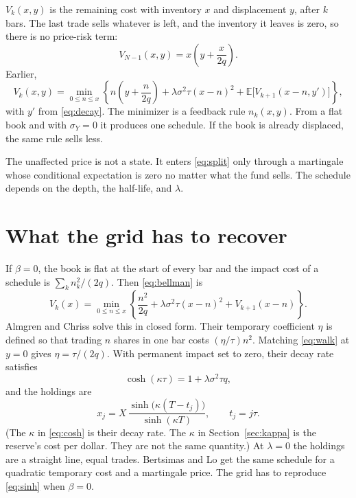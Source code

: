\documentclass[11pt]{article}
\begin{document}
\(V_k(x,y)\) is the remaining cost with inventory \(x\) and displacement \(y\), after \(k\) bars. The last trade sells whatever is left, and the inventory it leaves is zero, so there is no price-risk term:
\begin{equation}
\label{eq:terminal}
V_{N-1}(x,y) = x\left(y + \frac{x}{2q}\right).
\end{equation}
Earlier,
\begin{equation}
\label{eq:bellman}
V_k(x,y)
  = \min_{0\leq n\leq x}
    \left\{
      n\left(y+\frac{n}{2q}\right)
      + \lambda\sigma^{2}\tau(x-n)^{2}
      + \mathbb{E}\bigl[V_{k+1}(x-n, y')\bigr]
    \right\},
\end{equation}
with \(y'\) from \eqref{eq:decay}. The minimizer is a feedback rule \(n_k(x,y)\). From a flat book and with \(\sigma_Y = 0\) it produces one schedule. If the book is already displaced, the same rule sells less.

The unaffected price is not a state. It enters \eqref{eq:split} only through a martingale whose conditional expectation is zero no matter what the fund sells. The schedule depends on the depth, the half-life, and \(\lambda\).

\section{What the grid has to recover}
\label{sec:limits}

If \(\beta = 0\), the book is flat at the start of every bar and the impact cost of a schedule is \(\sum_k n_k^{2}/(2q)\). Then \eqref{eq:bellman} is
\begin{equation}
\label{eq:ac-bellman}
V_k(x)
  = \min_{0\leq n\leq x}
    \left\{
      \frac{n^{2}}{2q} + \lambda\sigma^{2}\tau(x-n)^{2} + V_{k+1}(x-n)
    \right\}.
\end{equation}
Almgren and Chriss solve this in closed form. Their temporary coefficient \(\eta\) is defined so that trading \(n\) shares in one bar costs \((\eta/\tau)n^{2}\). Matching \eqref{eq:walk} at \(y = 0\) gives \(\eta = \tau/(2q)\). With permanent impact set to zero, their decay rate satisfies
\begin{equation}
\label{eq:cosh}
\cosh(\kappa\tau) = 1 + \lambda\sigma^{2}\tau q,
\end{equation}
and the holdings are
\begin{equation}
\label{eq:sinh}
x_j = X\,\frac{\sinh\bigl(\kappa(T-t_j)\bigr)}{\sinh(\kappa T)}, \qquad t_j = j\tau.
\end{equation}
(The \(\kappa\) in \eqref{eq:cosh} is their decay rate. The \(\kappa\) in Section~\ref{sec:kappa} is the reserve's cost per dollar. They are not the same quantity.) At \(\lambda = 0\) the holdings are a straight line, equal trades. Bertsimas and Lo get the same schedule for a quadratic temporary cost and a martingale price. The grid has to reproduce \eqref{eq:sinh} when \(\beta = 0\).
\end{document}
